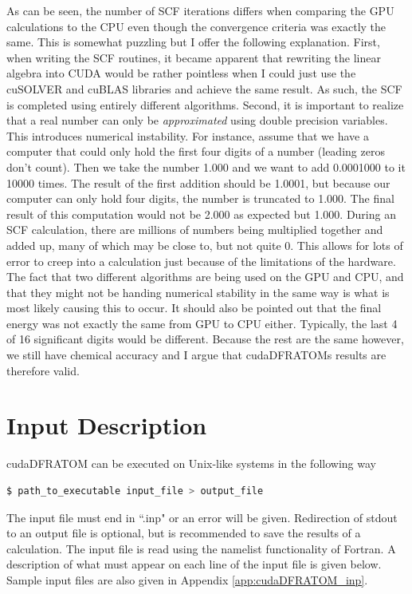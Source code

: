 As can be seen, the number of SCF iterations differs when comparing the GPU calculations to the CPU even though the convergence criteria was exactly the same. This is somewhat puzzling but I offer the following explanation. First, when writing the SCF routines, it became apparent that rewriting the linear algebra into CUDA would be rather pointless when I could just use the cuSOLVER and cuBLAS libraries and achieve the same result. As such, the SCF is completed using entirely different algorithms. Second, it is important to realize that a real number can only be \textit{approximated} using double precision variables. This introduces numerical instability. For instance, assume that we have a computer that could only hold the first four digits of a number (leading zeros don't count). Then we take the number 1.000 and we want to add 0.0001000 to it 10000 times. The result of the first addition should be 1.0001, but because our computer can only hold four digits, the number is truncated to 1.000. The final result of this computation would not be 2.000 as expected but 1.000. During an SCF calculation, there are millions of numbers being multiplied together and added up, many of which may be close to, but not quite 0. This allows for lots of error to creep into a calculation just because of the limitations of the hardware. The fact that two different algorithms are being used on the GPU and CPU, and that they might not be handing numerical stability in the same way is what is most likely causing this to occur. It should also be pointed out that the final energy was not exactly the same from GPU to CPU either. Typically, the last 4 of 16 significant digits would be different. Because the rest are the same however, we still have chemical accuracy and I argue that cudaDFRATOMs results are therefore valid.


\section{Input Description}\label{inp_des}
cudaDFRATOM can be executed on Unix-like systems in the following way
\begin{lstlisting}[language=bash]
	$ path_to_executable input_file > output_file
\end{lstlisting}

The input file must end in ``.inp" or an error will be given. Redirection of stdout to an output file is optional, but is recommended to save the results of a calculation. The input file is read using the namelist functionality of Fortran. A description of what must appear on each line of the input file is given below. Sample input files are also given in Appendix \ref{app:cudaDFRATOM_inp}.

